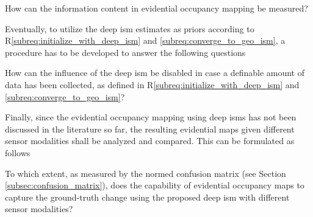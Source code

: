 \begin{requ} \label{requ:how_to_meas_info}
	How can the information content in evidential occupancy mapping be measured?
\end{requ}
Eventually, to utilize the deep \gls{ism} estimates as priors according to R\ref{subreq:initialize_with_deep_ism} and \ref{subreq:converge_to_geo_ism}, a procedure has to be developed to answer the following questions
\begin{requ} \label{requ:disable_deep_ism_influence}
	How can the influence of the deep \gls{ism} be disabled in case a definable amount of data has been collected, as defined in R\ref{subreq:initialize_with_deep_ism} and \ref{subreq:converge_to_geo_ism}?
\end{requ}
Finally, since the evidential occupancy mapping using deep \gls{ism}s has not been discussed in the literature so far, the resulting evidential maps given different sensor modalities shall be analyzed and compared. This can be formulated as follows
\\
\begin{requ} \label{requ:comp_deep_occ_maps}
	To which extent, as measured by the normed confusion matrix (see Section \ref{subsec:confusion_matrix}), does the capability of evidential occupancy maps to capture the ground-truth change using the proposed deep \gls{ism} with different sensor modalities?
\end{requ}
%
